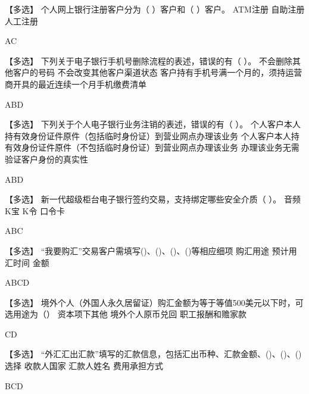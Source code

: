 \documentclass[kindlepaper]{BHCexam4kindle}
\begin{document}
\begin{questions}
\qs 【多选】 个人网上银行注册客户分为（  ）客户和（  ）客户。 \xx
{} {  ATM注册 } { 自助注册 } { 人工注册 }
\begin{solution} AC \end{solution}
\qs 【多选】 下列关于电子银行手机号删除流程的表述，错误的有（   ）。 \xx
{} {  不会删除其他客户的号码 } { 不会改变其他客户渠道状态 } { 客户持有手机号满一个月的，须持运营商开具的最近连续一个月手机缴费清单 }
\begin{solution} ABD \end{solution}
\qs 【多选】 下列关于个人电子银行业务注销的表述，错误的有（   ）。 \xx
{} {  个人客户本人持有效身份证件原件（包括临时身份证）到营业网点办理该业务 } { 个人客户本人持有效身份证件原件（不包括临时身份证）到营业网点办理该业务 } { 办理该业务无需验证客户身份的真实性 }
\begin{solution} ABD \end{solution}
\qs 【多选】 新一代超级柜台电子银行签约交易，支持绑定哪些安全介质（  ）。 \xx
{} {  音频K宝 } { K令 } { 口令卡 }
\begin{solution} ABC \end{solution}
\qs 【多选】 “我要购汇”交易客户需填写()、()、()、()等相应细项 \xx
{} {  购汇用途 } { 预计用汇时间 } { 金额 }
\begin{solution} ABCD \end{solution}
\qs 【多选】 境外个人（外国人永久居留证）购汇金额为等于等值500美元以下时，可选用途为（） \xx
{} {  资本项下其他 } { 境外个人原币兑回 } { 职工报酬和赡家款 }
\begin{solution} CD \end{solution}
\qs 【多选】 “外汇汇出汇款”填写的汇款信息，包括汇出币种、汇款金额、()、()、()选择 \xx
{} {  收款人国家 } { 汇款人姓名 } { 费用承担方式 }
\begin{solution} BCD \end{solution}

\end{questions}
\end{document}
